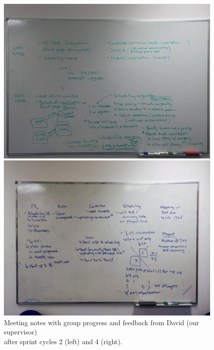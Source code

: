 \documentclass[a4paper]{article}
\begin{document}
\begin{figure}[H]
  \begin{minipage}{0.49\textwidth}
    \includegraphics[width = \textwidth, trim = 0 0.4cm 0 1.6cm, clip]{./evaluation/meeting-board2.jpg}
  \end{minipage}
  \begin{minipage}{0.49\textwidth}
    \includegraphics[width = \textwidth, trim = 1.2cm 1.5cm 1.2cm 2.5cm, clip]{./evaluation/meeting-board.jpg}
  \end{minipage}
  \caption{Meeting notes with group progress and feedback from David (our supervisor)\\
                    after sprint cycles 2 (left) and 4 (right).}
  \label{fig:meetingboard}
\end{figure}
\end{document}
